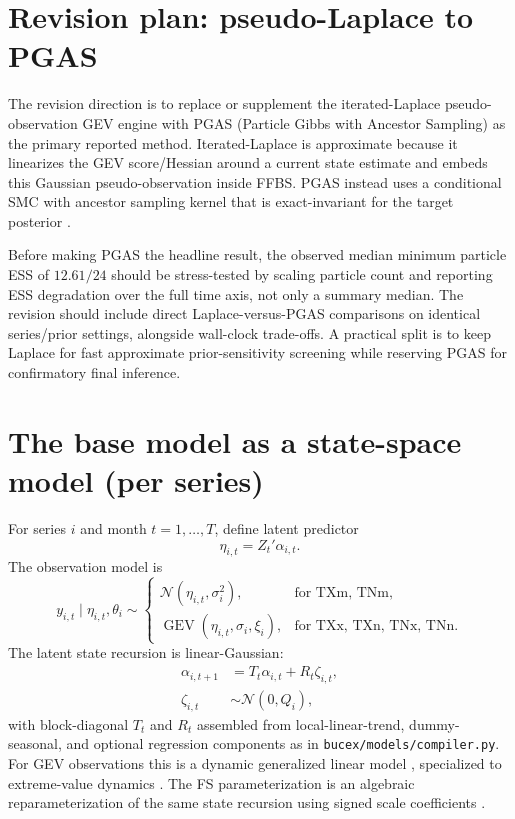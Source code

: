 \documentclass[11pt]{article}
\begin{document}
\section{Revision plan: pseudo-Laplace to PGAS}
The revision direction is to replace or supplement the iterated-Laplace pseudo-observation GEV engine with PGAS (Particle Gibbs with Ancestor Sampling) as the primary reported method. Iterated-Laplace is approximate because it linearizes the GEV score/Hessian around a current state estimate and embeds this Gaussian pseudo-observation inside FFBS. PGAS instead uses a conditional SMC with ancestor sampling kernel that is exact-invariant for the target posterior \cite{andrieu2010,lindsten2014}.

Before making PGAS the headline result, the observed median minimum particle ESS of $12.61/24$ should be stress-tested by scaling particle count and reporting ESS degradation over the full time axis, not only a summary median. The revision should include direct Laplace-versus-PGAS comparisons on identical series/prior settings, alongside wall-clock trade-offs. A practical split is to keep Laplace for fast approximate prior-sensitivity screening while reserving PGAS for confirmatory final inference.

\section{The base model as a state-space model (per series)}
For series $i$ and month $t=1,\ldots,T$, define latent predictor
\begin{equation}
\eta_{i,t} = Z_t'\alpha_{i,t}.
\end{equation}
The observation model is
\begin{equation}
y_{i,t} \mid \eta_{i,t},\theta_i \sim
\begin{cases}
\mathcal{N}(\eta_{i,t},\sigma_i^2), & \text{for TXm, TNm},\\
\operatorname{GEV}(\eta_{i,t},\sigma_i,\xi_i), & \text{for TXx, TXn, TNx, TNn}.
\end{cases}
\end{equation}
The latent state recursion is linear-Gaussian:
\begin{align}
\alpha_{i,t+1} &= T_t\alpha_{i,t} + R_t\zeta_{i,t}, \\
\zeta_{i,t} &\sim \mathcal{N}(0,Q_i),
\end{align}
with block-diagonal $T_t$ and $R_t$ assembled from local-linear-trend, dummy-seasonal, and optional regression components as in \texttt{bucex/models/compiler.py}. For GEV observations this is a dynamic generalized linear model \cite{west1985,fahrmeir1994}, specialized to extreme-value dynamics \cite{nogaj2006,parey2007,huerta2007,rootzen2013}. The FS parameterization is an algebraic reparameterization of the same state recursion using signed scale coefficients \cite{fruehwirth2010}.
\end{document}
